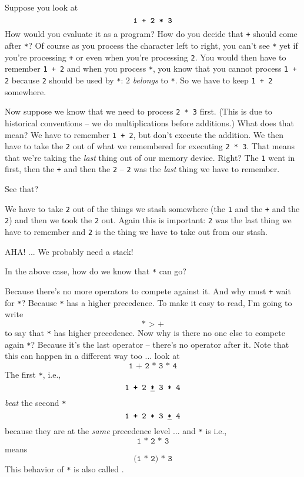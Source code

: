 Suppose you look at 
\[
\text{\texttt{1 + 2 * 3}}
\]
How would you evaluate it as a program?
How do you decide that \texttt{+} should come after \texttt{*}?
Of course as you process the character left to right, you can't see 
\texttt{*} yet if you're processing \texttt{+} or even when you're
processing \texttt{2}.
You would then have to remember \texttt{1 + 2}
and when you process \texttt{*}, you know that you cannot process
\texttt{1 + 2} because \texttt{2} should be used by \texttt{*}:
$2$ \textit{belongs} to \texttt{*}.
So we have to keep \texttt{1 + 2} somewhere.

Now suppose we know that we need to process \texttt{2 * 3} first.
(This is due to historical conventions -- we do multiplications
before additions.)
What does that mean?
We have to remember \texttt{1 + 2}, but don't execute the addition.
We then have to take the \texttt{2} out of what we remembered
for executing \verb!2 * 3!.
That means that we're taking the \textit{last} thing out of our
memory device.
Right?
The \texttt{1} went in first, then the \texttt{+} and then the \texttt{2} --
\verb!2! was the \textit{last} thing we have to remember.

See that?

We have to take \verb!2! out of the things we stash somewhere
(the \verb!1! and the \verb!+! and the \verb!2!)
and then we took the \verb!2! out.
Again this is important: \verb!2! was the last thing we have to remember
and \verb!2! is the thing we have to take out from our stash.


AHA! ... We probably need a stack!

In the above case, how do we know that \texttt{*} can go?

Because there's no more operators to compete against it.
And why must \texttt{+} wait for \texttt{*}?
Because \texttt{*} has a higher precedence.
To make it easy to read, I'm going to write
\[
\texttt{* > +}
\]
to say that \texttt{*} has higher precedence.
Now why is there no one else to compete again \texttt{*}?
Because it's the last operator -- there's no operator after it.
Note that this can happen in a different way too ...
look at
\[
\texttt{1 + 2 * 3 * 4}
\]
The first \texttt{*}, i.e.,
\[
\texttt{1 + 2 \underline{*} 3 * 4}
\]
\textit{beat} the second \texttt{*}
\[
\texttt{1 + 2 * 3 \underline{*} 4}
\]
because they are at the \textit{same} precedence level ... and
\texttt{*} is 
i.e.,
\[
\texttt{1 * 2 * 3} 
\]
means
\[
\texttt{(1 * 2) * 3}
\]
This behavior of \verb!*! is also called .

